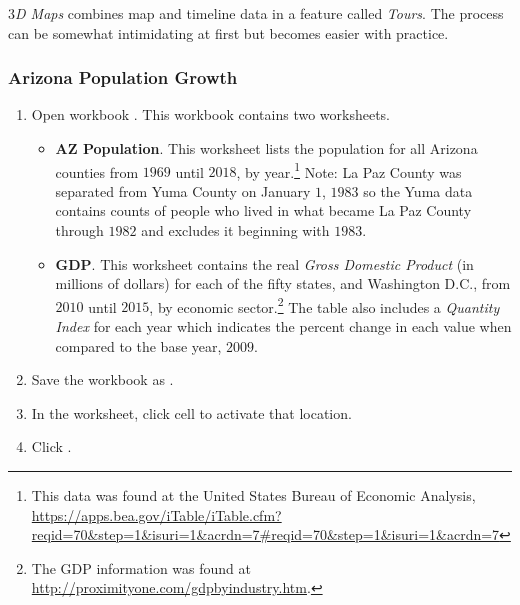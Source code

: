 \textit{$ 3 $D Maps} combines map and timeline data in a feature called \textit{Tours}. The process can be somewhat intimidating at first but becomes easier with practice.

\subsubsection{Arizona Population Growth}

\begin{enumerate}
	\item Open workbook . This workbook contains two worksheets.
	
	\begin{itemize}
		\item \textbf{AZ Population}. This worksheet lists the population for all Arizona counties from $ 1969 $ until $ 2018 $, by year.\footnote{This data was found at the United States Bureau of Economic Analysis, \url{https://apps.bea.gov/iTable/iTable.cfm?reqid=70&step=1&isuri=1&acrdn=7\#reqid=70&step=1&isuri=1&acrdn=7}} Note: La Paz County was separated from Yuma County on January $ 1 $, $ 1983 $ so the Yuma data contains counts of people who lived in what became La Paz County through $ 1982 $ and excludes it beginning with $ 1983 $.
		\item \textbf{GDP}. This worksheet contains the real \textit{Gross Domestic Product} (in millions of dollars) for each of the fifty states, and Washington D.C., from $ 2010 $ until $ 2015 $, by economic sector.\footnote{The GDP information was found at \url{http://proximityone.com/gdpbyindustry.htm}.} The table also includes a \textit{Quantity Index} for each year which indicates the percent change in each value when compared to the base year, $ 2009 $.
	\end{itemize}
	
	\item Save the workbook as .
	\item In the  worksheet, click cell  to activate that location.
	\item Click .
\end{enumerate}

